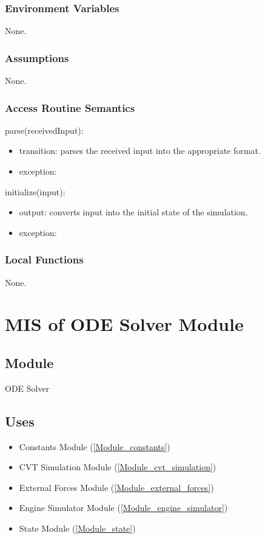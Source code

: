 \documentclass[12pt, titlepage]{article}
\begin{document}
\subsubsection{Environment Variables}

None.

\subsubsection{Assumptions}

None.

\subsubsection{Access Routine Semantics}
\noindent parse(receivedInput):
\begin{itemize}
\item transition: parses the received input into the appropriate format.
\item exception:  
\end{itemize}

\noindent initialize(input):
\begin{itemize}
\item output: converts input into the initial state of the simulation.
\item exception:  
\end{itemize}

\subsubsection{Local Functions}

None.

\newpage

\section{MIS of ODE Solver Module} \label{Module_ODE_solver}

\subsection{Module}

ODE Solver

\subsection{Uses}

\begin{itemize}
  \item Constants Module (\ref{Module_constants})
  \item CVT Simulation Module (\ref{Module_cvt_simulation})
  \item External Forces Module (\ref{Module_external_forces})
  \item Engine Simulator Module (\ref{Module_engine_simulator})
  \item State Module (\ref{Module_state})
\end{itemize}
\end{document}
